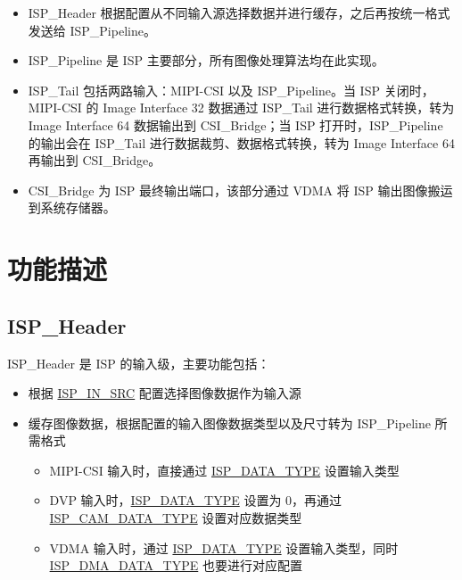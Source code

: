 \documentclass[main\_\_CN.tex]{subfiles}
\begin{document}
\begin{itemize}
    \item ISP\_Header 根据配置从不同输入源选择数据并进行缓存，之后再按统一格式发送给 ISP\_Pipeline。
    \item ISP\_Pipeline 是 ISP 主要部分，所有图像处理算法均在此实现。
    \item ISP\_Tail 包括两路输入：MIPI-CSI 以及 ISP\_Pipeline。当 ISP 关闭时，MIPI-CSI 的 Image Interface 32 数据通过 ISP\_Tail 进行数据格式转换，转为 Image Interface 64 数据输出到 CSI\_Bridge；当 ISP 打开时，ISP\_Pipeline 的输出会在 ISP\_Tail 进行数据裁剪、数据格式转换，转为 Image Interface 64 再输出到 CSI\_Bridge。
    \item CSI\_Bridge 为 ISP 最终输出端口，该部分通过 VDMA 将 ISP 输出图像搬运到系统存储器。
\end{itemize}



\section{功能描述}
\label{sec:isp-func-descr}

\subsection{ISP\_Header}
ISP\_Header 是 ISP 的输入级，主要功能包括：

\begin{itemize}
    \item 根据 \hyperref[fielddesc:ISPINSRC]{ISP\_IN\_SRC} 配置选择图像数据作为输入源
    \item 缓存图像数据，根据配置的输入图像数据类型以及尺寸转为 ISP\_Pipeline 所需格式
    \begin{itemize}
        \item MIPI-CSI 输入时，直接通过 \hyperref[fielddesc:ISPDATATYPE]{ISP\_DATA\_TYPE} 设置输入类型
        \item DVP 输入时，\hyperref[fielddesc:ISPDATATYPE]{ISP\_DATA\_TYPE} 设置为 0，再通过 \hyperref[fielddesc:ISPCAMDATATYPE]{ISP\_CAM\_DATA\_TYPE} 设置对应数据类型
        \item VDMA 输入时，通过 \hyperref[fielddesc:ISPDATATYPE]{ISP\_DATA\_TYPE} 设置输入类型，同时 \hyperref[fielddesc:ISPDMADATATYPE]{ISP\_DMA\_DATA\_TYPE} 也要进行对应配置
    \end{itemize}
\end{itemize}
\end{document}
